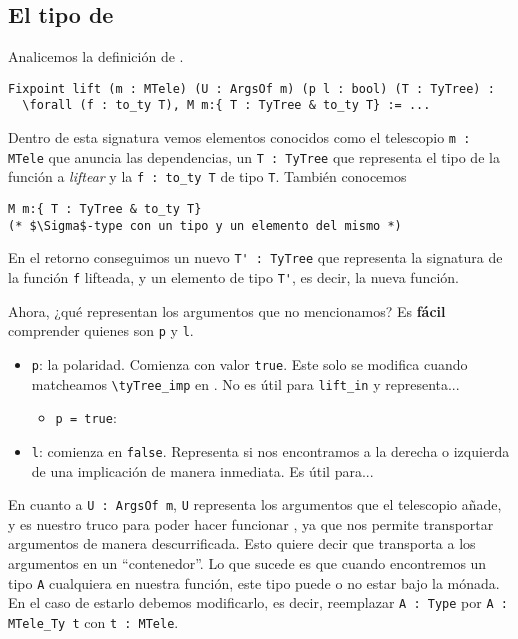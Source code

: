 
\subsection{El tipo de \lift}

Analicemos la definición de \lift.

\begin{lstlisting}
Fixpoint lift (m : MTele) (U : ArgsOf m) (p l : bool) (T : TyTree) :
  \forall (f : to_ty T), M m:{ T : TyTree & to_ty T} := ...
\end{lstlisting}

Dentro de esta signatura vemos elementos conocidos como el telescopio \lstinline{m : MTele} que anuncia las dependencias, un \lstinline{T : TyTree} que representa el tipo de la función a \textit{liftear} y la \lstinline{f : to_ty T} de tipo \lstinline{T}.
También conocemos
\begin{lstlisting}
M m:{ T : TyTree & to_ty T}
(* $\Sigma$-type con un tipo y un elemento del mismo *)
\end{lstlisting}

En el retorno conseguimos un nuevo \lstinline{T' : TyTree} que representa la signatura de la función \lstinline{f} lifteada, y un elemento de tipo \lstinline{T'}, es decir, la nueva función.

Ahora, ¿qué representan los argumentos que no mencionamos? Es \textbf{fácil} comprender quienes son \lstinline{p} y \lstinline{l}.
\begin{itemize}
    \item \lstinline{p}: la polaridad. Comienza con valor \lstinline{true}. Este solo se modifica cuando matcheamos \lstinline{\tyTree_imp} en \lift. No es útil para \lstinline{lift_in} y representa...
    \begin{itemize}
        \item \lstinline{p = true}:
    \end{itemize}
    \item \lstinline{l}: comienza en \lstinline{false}. Representa si nos encontramos a la derecha o izquierda de una implicación de manera inmediata. Es útil para...
\end{itemize}

En cuanto a \lstinline{U : ArgsOf m}, \lstinline{U} representa los argumentos que el telescopio añade, y es nuestro truco para poder hacer funcionar \lift, ya que nos permite transportar argumentos de manera descurrificada.
Esto quiere decir que transporta a los argumentos en un ``contenedor''.
Lo que sucede es que cuando encontremos un tipo \lstinline{A} cualquiera en nuestra función, este tipo puede o no estar bajo la mónada.
En el caso de estarlo debemos modificarlo, es decir, reemplazar \lstinline{A : Type} por \lstinline{A : MTele_Ty t} con \lstinline{t : MTele}.

